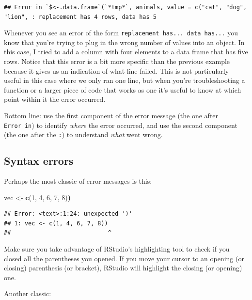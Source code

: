 \documentclass[
]{book}
\newenvironment{Shaded}{\begin{snugshade}}{\end{snugshade}}
\newcommand{\DecValTok}[1]{\textcolor[rgb]{0.00,0.00,0.81}{#1}}
\newcommand{\ErrorTok}[1]{\textcolor[rgb]{0.64,0.00,0.00}{\textbf{#1}}}
\newcommand{\FunctionTok}[1]{\textcolor[rgb]{0.13,0.29,0.53}{\textbf{#1}}}
\newcommand{\NormalTok}[1]{#1}
\newcommand{\OtherTok}[1]{\textcolor[rgb]{0.56,0.35,0.01}{#1}}
\begin{document}
\begin{verbatim}
## Error in `$<-.data.frame`(`*tmp*`, animals, value = c("cat", "dog", "lion", : replacement has 4 rows, data has 5
\end{verbatim}

Whenever you see an error of the form \texttt{replacement\ has...\ data\ has...} you know
that you're trying to plug in the wrong number of values into an object. In this
case, I tried to add a column with four elements to a data frame that has five
rows. Notice that this error is a bit more specific than the previous example
because it gives us an indication of what line failed. This is not particularly
useful in this case where we only ran one line, but when you're troubleshooting
a function or a larger piece of code that works as one it's useful to know at
which point within it the error occurred.

Bottom line: use the first component of the error message (the one after
\texttt{Error\ in}) to identify \emph{where} the error occurred, and use the second component
(the one after the \texttt{:}) to understand \emph{what} went wrong.

\hypertarget{syntax-errors}{%
\subsection{Syntax errors}\label{syntax-errors}}

Perhaps the most classic of error messages is this:

\begin{Shaded}
\begin{Highlighting}[]
\NormalTok{vec }\OtherTok{\textless{}{-}} \FunctionTok{c}\NormalTok{(}\DecValTok{1}\NormalTok{, }\DecValTok{4}\NormalTok{, }\DecValTok{6}\NormalTok{, }\DecValTok{7}\NormalTok{, }\DecValTok{8}\NormalTok{)}\ErrorTok{)}
\end{Highlighting}
\end{Shaded}

\begin{verbatim}
## Error: <text>:1:24: unexpected ')'
## 1: vec <- c(1, 4, 6, 7, 8))
##                            ^
\end{verbatim}

Make sure you take advantage of RStudio's highlighting tool to check if you
closed all the parentheses you opened. If you move your cursor to an opening (or
closing) parenthesis (or bracket), RStudio will highlight the closing (or
opening) one.

Another classic:
\end{document}
